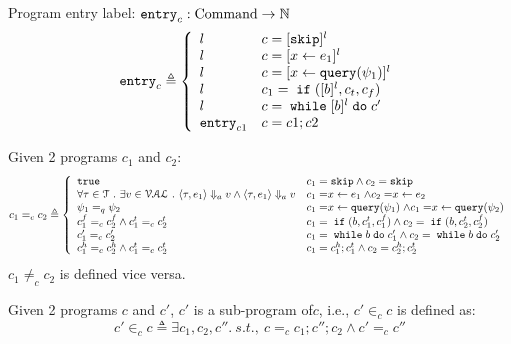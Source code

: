 %
Program entry label: $\mathtt{entry}_c : \mbox{Command} \to \mathbb{N}$ 
\[
  \entry_c \triangleq 
\left\{
  \begin{array}{ll} 
     l       
    & c = [\eskip]{}^l
    \\ 
    l    & c = [\assign{x}{\expr_1}]{}^l
    \\ 
    l      
    & c = [\assign{x}{\query(\qexpr_1)}]{}^l
    \\
   l
    & c_1 = \eif([b]{}^l, c_t, c_f)
    \\ 
    l         
    & c = \ewhile [b]^l \edo c'
    \\ 
    \entry_{c1}
    & c = c1;c2
  \end{array}
  \right.
\]
%
\begin{defn}
%
\label{def:aq_prog}
Given 2 programs $c_1$ and $c_2$:
\[
c_1 =_{c} c_2
\triangleq 
\left\{
  \begin{array}{ll} 
    \etrue        
    & c_1 = \eskip \land c_2 = \eskip
    \\ 
    \forall \trace \in \mathcal{T} \st \exists v \in \mathcal{VAL}
    \st \config{ \trace, \expr_1} \aarrow v \land \config{ \trace, \expr_1} \aarrow v     
    & c_1 = \assign{x}{\expr_1} \land c_2 = \assign{x}{\expr_2} 
    \\ 
    \qexpr_1 =_{q} \qexpr_2       
    & c_1 = \assign{x}{\query(\qexpr_1)} \land c_1 = \assign{x}{\query(\qexpr_2)} 
    \\
    c_1^f =_{c} c_2^f \land c_1^t =_{c} c_2^t
    & c_1 = \eif(b, c_1^t, c_1^f) \land c_2 = \eif(b, c_2^t, c_2^f)
    \\ 
    c_1' =_{c} c_2'         
    & c_1 = \ewhile b \edo c_1' \land c_2 = \ewhile b \edo c_2'
    \\ 
    c_1^h =_{c} c_2^h \land c_1^t =_{c} c_2^t
    & c_1 = c_1^h;c_1^t \land c_2 = c_2^h;c_2^t 
  \end{array}
  \right.
\]
%
$c_1 \neq_{c} c_2$  is defined vice versa.
%
\end{defn}
%
Given 2 programs $c$ and $c'$, $c'$ is a sub-program of$c$, i.e., $c' \in_{c} c$ is defined as:
\begin{equation}
c' \in_{c} c \triangleq \exists c_1, c_2, c''. ~ s.t.,~
c =_{c} c_1; c''; c_2 \land c' =_{c} c''
\end{equation} 
%
